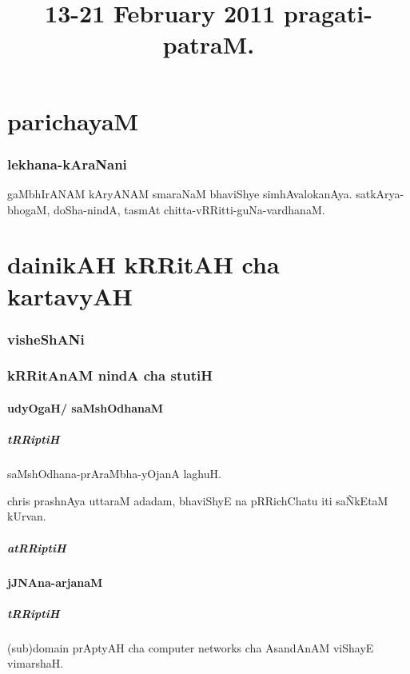 \documentclass[oneside, article]{memoir}
\title{13-21 February 2011 pragati-patraM.}
\date{}
\begin{document}
\maketitle

\part{parichayaM}

\section{lekhana-kAraNani}
gaMbhIrANAM kAryANAM smaraNaM bhaviShye simhAvalokanAya. satkArya-bhogaM, doSha-nindA, tasmAt chitta-vRRitti-guNa-vardhanaM.

\part{dainikAH kRRitAH cha kartavyAH}
\section{visheShANi}


\section{kRRitAnAM nindA cha stutiH}
\subsection{udyOgaH/ saMshOdhanaM}
\subsubsection{tRRiptiH}
saMshOdhana-prAraMbha-yOjanA laghuH.

chris prashnAya uttaraM adadam, bhaviShyE na pRRichChatu iti sa\~NkEtaM kUrvan.

\subsubsection{atRRiptiH}

\subsection{jJNAna-arjanaM}
\subsubsection{tRRiptiH}
(sub)domain prAptyAH cha computer networks cha AsandAnAM viShayE vimarshaH.
\end{document}

